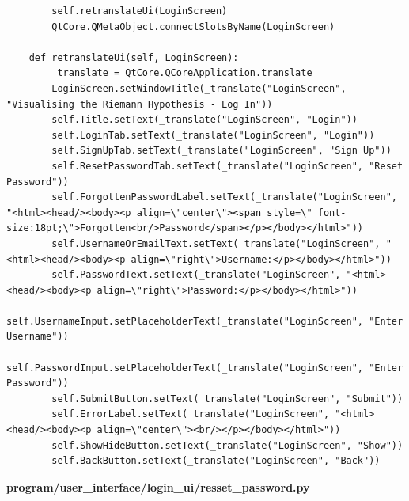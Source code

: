 \documentclass{article}
\begin{document}
\begin{lstlisting}
        self.retranslateUi(LoginScreen)
        QtCore.QMetaObject.connectSlotsByName(LoginScreen)

    def retranslateUi(self, LoginScreen):
        _translate = QtCore.QCoreApplication.translate
        LoginScreen.setWindowTitle(_translate("LoginScreen", "Visualising the Riemann Hypothesis - Log In"))
        self.Title.setText(_translate("LoginScreen", "Login"))
        self.LoginTab.setText(_translate("LoginScreen", "Login"))
        self.SignUpTab.setText(_translate("LoginScreen", "Sign Up"))
        self.ResetPasswordTab.setText(_translate("LoginScreen", "Reset Password"))
        self.ForgottenPasswordLabel.setText(_translate("LoginScreen", "<html><head/><body><p align=\"center\"><span style=\" font-size:18pt;\">Forgotten<br/>Password</span></p></body></html>"))
        self.UsernameOrEmailText.setText(_translate("LoginScreen", "<html><head/><body><p align=\"right\">Username:</p></body></html>"))
        self.PasswordText.setText(_translate("LoginScreen", "<html><head/><body><p align=\"right\">Password:</p></body></html>"))
        self.UsernameInput.setPlaceholderText(_translate("LoginScreen", "Enter Username"))
        self.PasswordInput.setPlaceholderText(_translate("LoginScreen", "Enter Password"))
        self.SubmitButton.setText(_translate("LoginScreen", "Submit"))
        self.ErrorLabel.setText(_translate("LoginScreen", "<html><head/><body><p align=\"center\"><br/></p></body></html>"))
        self.ShowHideButton.setText(_translate("LoginScreen", "Show"))
        self.BackButton.setText(_translate("LoginScreen", "Back"))
\end{lstlisting}


\textbf{program/user\_interface/login\_ui/resset\_password.py}
\end{document}

